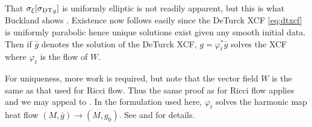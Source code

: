 \documentclass[a4paper,12pt]{amsart}
\begin{document}
That \(\sigma_{\xi}[\operatorname{\operatorname{\sigma}_{\operatorname{DT}}}_g]\) is uniformly elliptic is not readily apparent, but this is what Buckland shows \cite{MR2207496}. Existence now follows easily since the DeTurck XCF \eqref{eq:dtxcf} is uniformly parabolic hence unique solutions exist given any smooth initial data. Then if \(\bar{g}\) denotes the solution of the DeTurck XCF, \(g = \varphi_t^{\ast} \bar{g}\) solves the XCF where \(\varphi_t\) is the flow of \(W\).

For uniqueness, more work is required, but note that the vector field \(W\) is the same as that used for Ricci flow. Thus the same proof as for Ricci flow applies and we may appeal to \cite[Section 6]{MR1375255}. In the formulation used here, \(\varphi_t\) solves the harmonic map heat flow \((M, \bar{g}) \to (M, g_0)\). See \cite[Section 5.2]{MR2265040} and \cite[Sections 3.3, 3.4]{MR2061425} for details.
\end{document}

